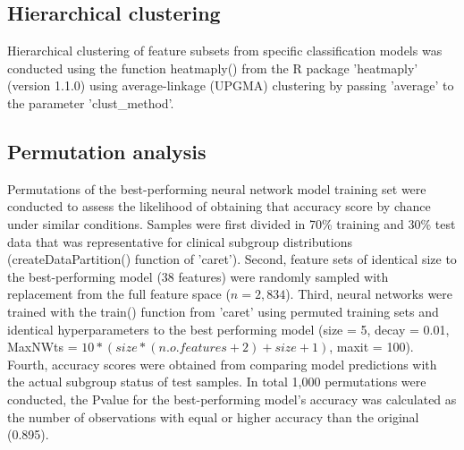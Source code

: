 \subsection{Hierarchical clustering}
    Hierarchical clustering of feature subsets from specific classification models was conducted using the function heatmaply() from the R package 'heatmaply' (version 1.1.0) using average-linkage (UPGMA) clustering by passing 'average' to the parameter 'clust\_method'.
    
\subsection{Permutation analysis}
    Permutations of the best-performing neural network model training set were conducted to assess the likelihood of obtaining that accuracy score by chance under similar conditions. Samples were first divided in 70\% training and 30\% test data that was representative for clinical subgroup distributions (createDataPartition() function of 'caret'). Second, feature sets of identical size to the best-performing model (38 features) were randomly sampled with replacement from the full feature space ($n = 2,834$). Third, neural networks were trained with the train() function from 'caret' using permuted training sets and identical hyperparameters to the best performing model (size = 5, decay = 0.01, MaxNWts = $10 * (size * (n.o. features + 2) + size + 1)$, maxit = 100). Fourth, accuracy scores were obtained from comparing model predictions with the actual subgroup status of test samples. In total 1,000 permutations were conducted, the Pvalue for the best-performing model's accuracy was calculated as the number of observations with equal or higher accuracy than the original (0.895).